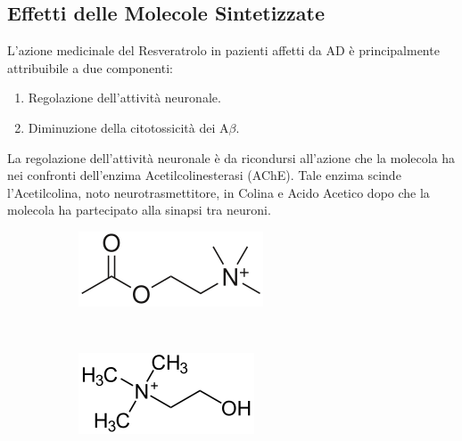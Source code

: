\documentclass[a4paper, 12pt]{article}
\begin{document}
\subsection{Effetti delle Molecole Sintetizzate}
\label{effetti_resveratrolo}
L'azione medicinale del Resveratrolo in pazienti affetti da AD è principalmente attribuibile a due componenti:

\begin{enumerate}
	\item Regolazione dell'attività neuronale.
	\item Diminuzione della citotossicità dei A$\beta$.
\end{enumerate}

La regolazione dell'attività neuronale è da ricondursi all'azione che la molecola ha nei confronti dell'enzima Acetilcolinesterasi (AChE). Tale enzima scinde l'Acetilcolina, noto neurotrasmettitore, in Colina e Acido Acetico dopo che la molecola ha partecipato alla sinapsi tra neuroni.

\begin{figure}[H]
	\centering
	\begin{subfigure}[b]{0.3\linewidth}
		\includegraphics[width=\linewidth]{immagini/acetilcolina.png}
	\end{subfigure}
	~
	\begin{subfigure}[b]{0.3\linewidth}
		\includegraphics[width=\linewidth]{immagini/colina.png}
	\end{subfigure}
	\label{fig:coline}
\end{figure}
\end{document}
